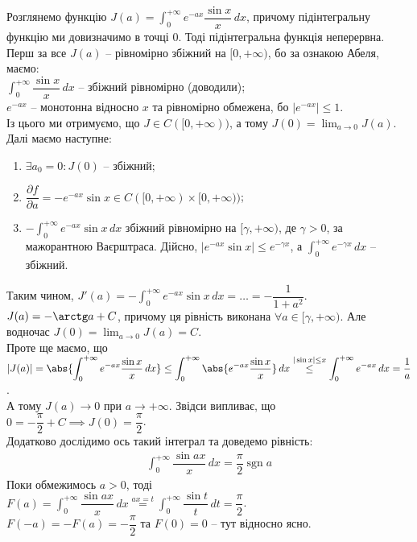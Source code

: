 \documentclass[a4paper, 10pt]{article}
\def\departial#1#2{\dfrac{\partial {#1}}{\partial {#2}}}
\def\huge{\displaystyle}
\DeclareMathOperator\sign{sgn}
\theoremstyle{theoremdd}
\theoremstyle{theoremdd}
\theoremstyle{theoremdd}
\theoremstyle{theoremdd}
\theoremstyle{theoremdd}
\theoremstyle{theoremdd}
\theoremstyle{theoremdd}
\theoremstyle{theoremdd}
\theoremstyle{theoremdd}
\begin{document}
Розглянемо функцію $J(a) = \huge\int_0^{+\infty} e^{-ax} \dfrac{\sin x}{x}\,dx$, причому підінтегральну функцію ми довизначимо в точці $0$. Тоді підінтегральна функція неперервна.\\
Перш за все $J(a)$ -- рівномірно збіжний на $[0,+\infty)$, бо за ознакою Абеля, маємо:\\
$\huge\int_0^{+\infty} \dfrac{\sin x}{x}\,dx$ -- збіжний рівномірно (доводили);\\
$e^{-ax}$ -- монотонна відносно $x$ та рівномірно обмежена, бо $|e^{-ax}| \leq 1$.\\
Із цього ми отримуємо, що $J \in C([0,+\infty))$, а тому $\huge J(0) = \lim_{a \to 0} J(a)$. Далі маємо наступне:
\begin{enumerate}[nosep,wide=0pt,label={\arabic*)}]
\item $\exists a_0 = 0: J(0)$ -- збіжний;
\item $\departial{f}{a} = -e^{-ax} \sin x \in C([0,+\infty) \times [0,+\infty))$;
\item $-\huge\int_0^{+\infty} e^{-ax}\sin x\,dx$ збіжний рівномірно на $[\gamma,+\infty)$, де $\gamma > 0$, за мажорантною Ваєрштраса. Дійсно,
$|e^{-ax} \sin x| \leq e^{-\gamma x}$, а $\huge\int_0^{+\infty} e^{-\gamma x}\,dx$ -- збіжний.
\end{enumerate}
Таким чином, $J'(a) = -\huge\int_0^{+\infty} e^{-ax} \sin x \,dx = \dots = -\dfrac{1}{1+a^2}$.\\
$J(a) = -\arctg a + C$, причому ця рівність виконана $\forall a \in [\gamma,+\infty)$.
Але водночас $J(0) = \huge\lim_{a \to 0} J(a) = C$.\\
Проте ще маємо, що $\huge |J(a)| = \abs{\int_0^{+\infty} e^{-ax} \dfrac{\sin x}{x}\,dx} \leq \int_0^{+\infty} \abs{e^{-ax} \dfrac{\sin x}{x}} \,dx \overset{|\sin x| \leq x}{\leq} \int_0^{+\infty} e^{-ax}\,dx = \dfrac{1}{a}$.\\
А тому $J(a) \to 0$ при $a \to +\infty$. Звідси випливає, що $0 = -\dfrac{\pi}{2} + C \implies J(0) = \dfrac{\pi}{2}$.
\bigskip \\
Додатково дослідимо ось такий інтеграл та доведемо рівність:
\begin{align*}
\int_0^{+\infty} \dfrac{\sin ax}{x}\,dx = \dfrac{\pi}{2} \sign a
\end{align*}
Поки обмежимось $a>0$, тоді\\
$F(a) = \huge\int_0^{+\infty} \dfrac{\sin ax}{x}\,dx \overset{ax = t}{=} \int_0^{+\infty} \dfrac{\sin t}{t}\,dt = \dfrac{\pi}{2}$.\\
$F(-a) = -F(a) = -\dfrac{\pi}{2}$ та $F(0) = 0$ -- тут відносно ясно.
\end{document}
